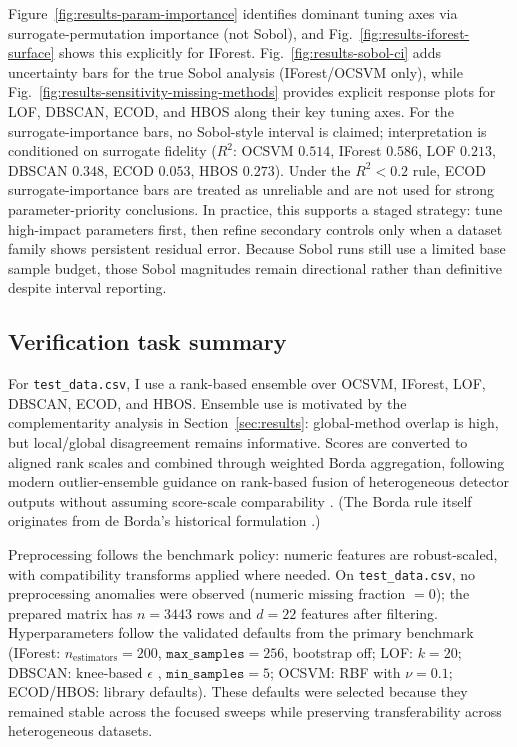 \documentclass[cameraready]{Interspeech}
\begin{document}
Figure~\ref{fig:results-param-importance} identifies dominant tuning axes via surrogate-permutation importance (not Sobol), and Fig.~\ref{fig:results-iforest-surface} shows this explicitly for IForest. Fig.~\ref{fig:results-sobol-ci} adds uncertainty bars for the true Sobol analysis (IForest/OCSVM only), while Fig.~\ref{fig:results-sensitivity-missing-methods} provides explicit response plots for LOF, DBSCAN, ECOD, and HBOS along their key tuning axes. For the surrogate-importance bars, no Sobol-style interval is claimed; interpretation is conditioned on surrogate fidelity (\(R^2\): OCSVM \(0.514\), IForest \(0.586\), LOF \(0.213\), DBSCAN \(0.348\), ECOD \(0.053\), HBOS \(0.273\)). Under the \(R^2<0.2\) rule, ECOD surrogate-importance bars are treated as unreliable and are not used for strong parameter-priority conclusions. In practice, this supports a staged strategy: tune high-impact parameters first, then refine secondary controls only when a dataset family shows persistent residual error. Because Sobol runs still use a limited base sample budget, those Sobol magnitudes remain directional rather than definitive despite interval reporting.

\subsection{Verification task summary}

For \texttt{test\_data.csv}, I use a rank-based ensemble over OCSVM, IForest, LOF, DBSCAN, ECOD, and HBOS. Ensemble use is motivated by the complementarity analysis in Section~\ref{sec:results}: global-method overlap is high, but local/global disagreement remains informative. Scores are converted to aligned rank scales and combined through weighted Borda aggregation, following modern outlier-ensemble guidance on rank-based fusion of heterogeneous detector outputs without assuming score-scale comparability \cite{aggarwal2015outlierensembles}. (The Borda rule itself originates from de Borda's historical formulation \cite{borda1781}.)

Preprocessing follows the benchmark policy: numeric features are robust-scaled, with compatibility transforms applied where needed. On \texttt{test\_data.csv}, no preprocessing anomalies were observed (numeric missing fraction \(=0\)); the prepared matrix has \(n=3443\) rows and \(d=22\) features after filtering. Hyperparameters follow the validated defaults from the primary benchmark (IForest: \(n_{\text{estimators}}=200\), \(\texttt{max\_samples}=256\), bootstrap off; LOF: \(k=20\); DBSCAN: knee-based \(\epsilon\) \cite{satopaa2011kneedle}, \(\texttt{min\_samples}=5\); OCSVM: RBF with \(\nu=0.1\); ECOD/HBOS: library defaults). These defaults were selected because they remained stable across the focused sweeps while preserving transferability across heterogeneous datasets.
\end{document}
